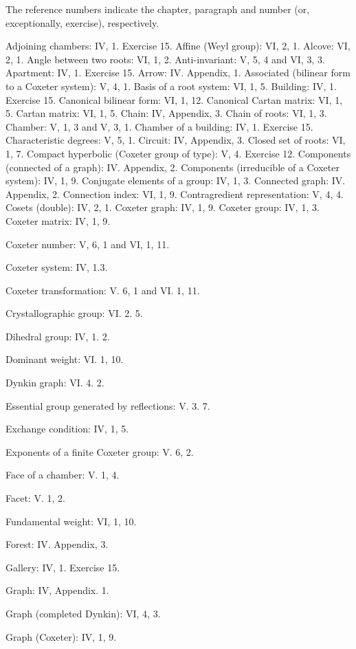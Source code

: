 
The reference numbers indicate the chapter, paragraph and number (or, exceptionally, exercise), respectively.

Adjoining chambers: IV, 1. Exercise 15. Affine (Weyl group): VI, 2, 1. Alcove: VI, 2, 1. Angle between two roots: VI, 1, 2. Anti-invariant: V, 5, 4 and VI, 3, 3. Apartment: IV, 1. Exercise 15. Arrow: IV. Appendix, 1. Associated (bilinear form to a Coxeter system): V, 4, 1. Basis of a root system: VI, 1, 5. Building: IV, 1. Exercise 15. Canonical bilinear form: VI, 1, 12. Canonical Cartan matrix: VI, 1, 5. Cartan matrix: VI, 1, 5. Chain: IV, Appendix, 3. Chain of roots: VI, 1, 3. Chamber: V, 1, 3 and V, 3, 1. Chamber of a building: IV, 1. Exercise 15. Characteristic degrees: V, 5, 1. Circuit: IV, Appendix, 3. Closed set of roots: VI, 1, 7. Compact hyperbolic (Coxeter group of type): V, 4. Exercise 12. Components (connected of a graph): IV. Appendix, 2. Components (irreducible of a Coxeter system): IV, 1, 9. Conjugate elements of a group: IV, 1, 3. Connected graph: IV. Appendix, 2. Connection index: VI, 1, 9. Contragredient representation: V, 4, 4. Cosets (double): IV, 2, 1. Coxeter graph: IV, 1, 9. Coxeter group: IV, 1, 3. Coxeter matrix: IV, 1, 9.

Coxeter number: V, 6, 1 and VI, 1, 11.

Coxeter system: IV, 1.3.

Coxeter transformation: V. 6, 1 and VI. 1, 11.

Crystallographic group: VI. 2. 5.

Dihedral group: IV, 1. 2.

Dominant weight: VI. 1, 10.

Dynkin graph: VI. 4. 2.

Essential group generated by reflections: V. 3. 7.

Exchange condition: IV, 1, 5.

Exponents of a finite Coxeter group: V. 6, 2.

Face of a chamber: V. 1, 4.

Facet: V. 1, 2.

Fundamental weight: VI, 1, 10.

Forest: IV. Appendix, 3.

Gallery: IV, 1. Exercise 15.

Graph: IV, Appendix. 1.

Graph (completed Dynkin): VI, 4, 3.

Graph (Coxeter): IV, 1, 9.

